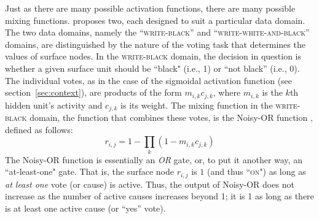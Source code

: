 Just as there are many possible activation functions, there are many 
possible mixing functions.
\citet{saund:94} proposes two, each designed 
to suit a particular data domain.  The two data domains, namely 
the ``\textsc{write-black}'' and ``\textsc{write-white-and-black}'' 
domains, are distinguished by the nature of the voting task that 
determines the values of surface nodes. 
In the \textsc{write-black} domain, the decision in question is 
 whether a given surface unit should be ``black" (i.e., 1) or ``not black'' (i.e., 0). 
 The individual votes, as in the case of the sigmoidal activation function (see section~\ref{sec:context}), are products of the form $m_{i,k} c_{j,k}$,
 where $m_{i,k}$ is the $k$th hidden unit's activity and $c_{j,k}$ is its weight.
The mixing function in the \textsc{write-black} domain, the function that combines these votes,
 is the Noisy-OR function \citep{pearl:1988}, defined as follows:
\begin{equation}\label{eq:noisy-or}
r_{i,j} = 1 - \prod\limits_{k} (1 - m_{i,k} c_{j,k})
\end{equation}
 The Noisy-OR function is essentially an \textit{OR} gate, or, to put it another way, 
 an ``at-least-one" gate. That is, the surface node $r_{i,j}$ is $1$ (and thus ``\textsc{on}") as long as 
 \emph{at least one} vote (or cause) is active.
Thus, the output of Noisy-OR does not increase
as the number of active causes increases beyond 1; it is 1 as long as there is at least one active cause (or ``yes'' vote).


